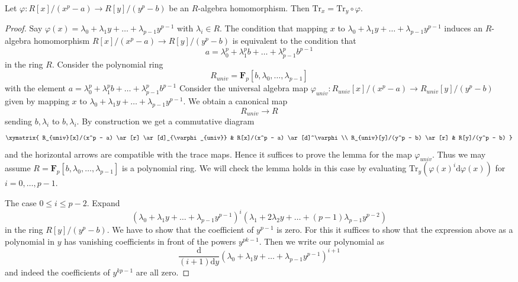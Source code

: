 \begin{lemma}
\label{lemma-trace-well-defined}
Let $\varphi : R[x]/(x^p - a) \to R[y]/(y^p - b)$ be an $R$-algebra
homomorphism. Then $\text{Tr}_x = \text{Tr}_y \circ \varphi$.
\end{lemma}

\begin{proof}
Say $\varphi(x) = \lambda_0 + \lambda_1 y + \ldots + \lambda_{p - 1}y^{p - 1}$
with $\lambda_i \in R$. The condition that mapping $x$ to
$\lambda_0 + \lambda_1 y + \ldots + \lambda_{p - 1}y^{p - 1}$
induces an $R$-algebra homomorphism $R[x]/(x^p - a) \to R[y]/(y^p - b)$
is equivalent to the condition that
$$
a = \lambda_0^p + \lambda_1^p b + \ldots + \lambda_{p - 1}^pb^{p - 1}
$$
in the ring $R$. Consider the polynomial ring
$$
R_{univ} = \mathbf{F}_p[b, \lambda_0, \ldots, \lambda_{p - 1}]
$$
with the element
$a = \lambda_0^p + \lambda_1^p b + \ldots + \lambda_{p - 1}^pb^{p - 1}$
Consider the universal algebra map
$\varphi_{univ} : R_{univ}[x]/(x^p - a) \to R_{univ}[y]/(y^p - b)$
given by mapping $x$ to
$\lambda_0 + \lambda_1 y + \ldots + \lambda_{p - 1}y^{p - 1}$.
We obtain a canonical map
$$
R_{univ} \longrightarrow R
$$
sending $b, \lambda_i$ to $b, \lambda_i$. By construction we get a
commutative diagram
$$
\xymatrix{
R_{univ}[x]/(x^p - a) \ar[r] \ar[d]_{\varphi_{univ}} &
R[x]/(x^p - a) \ar[d]^\varphi \\
R_{univ}[y]/(y^p - b) \ar[r] & R[y]/(y^p - b)
}
$$
and the horizontal arrows are compatible with the trace maps. Hence it
suffices to prove the lemma for the map $\varphi_{univ}$. Thus we may
assume $R = \mathbf{F}_p[b, \lambda_0, \ldots, \lambda_{p - 1}]$
is a polynomial ring. We will check the lemma holds in this case
by evaluating
$\text{Tr}_y(\varphi(x)^i\text{d}\varphi(x))$ for $i = 0 , \ldots, p - 1$.

\medskip\noindent
The case $0 \leq i \leq p - 2$. Expand
$$
(\lambda_0 + \lambda_1 y + \ldots + \lambda_{p - 1}y^{p - 1})^i
(\lambda_1 + 2 \lambda_2 y + \ldots + (p - 1)\lambda_{p - 1}y^{p - 2})
$$
in the ring $R[y]/(y^p - b)$. We have to show that the coefficient
of $y^{p - 1}$ is zero. For this it suffices to show that
the expression above as a polynomial in $y$ has vanishing
coefficients in front of the powers $y^{pk - 1}$.
Then we write our polynomial as
$$
\frac{\text{d}}{(i + 1)\text{d}y}
(\lambda_0 + \lambda_1 y + \ldots + \lambda_{p - 1}y^{p - 1})^{i + 1}
$$
and indeed the coefficients of $y^{kp - 1}$ are all zero.


\end{proof}
